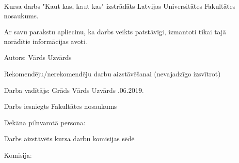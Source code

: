 Kursa darbs "Kaut kas, kaut kas" izstrādāts Latvijas
Universitātes Fakultātes nosaukums.
\vspace{1.5\baselineskip}

Ar savu parakstu apliecinu, ka darbs veikts patstāvīgi, izmantoti tikai tajā norādītie informācijas
avoti.

Autors: \makebox[1.5in]{\hrulefill} Vārds Uzvārds
\vspace{1.5\baselineskip}

Rekomendēju/nerekomendēju darbu aizstāvēšanai (nevajadzīgo izsvītrot)

Darba vadītājs: Grāds Vārds Uzvārds \makebox[1.5in]{\hrulefill} \makebox[.25in]{\hrulefill}.06.2019.
\vspace{1.5\baselineskip}

Darbs iesniegts Fakultātes nosaukums
\medskip

Dekāna pilnvarotā persona:
\vspace{1.5\baselineskip}

Darbs aizstāvēts kursa darbu komisijas sēdē

Komisija: